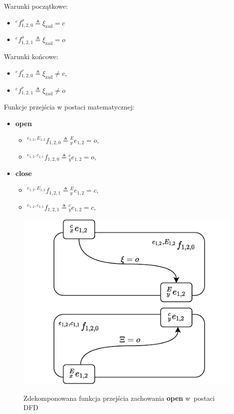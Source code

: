 Warunki początkowe:
\begin{itemize}
    \item ${}^{e}f^{\sigma}_{1,2,0} \triangleq \xi_{\mathrm{zad}} = c$
    \item ${}^{e}f^{\sigma}_{1,2,1} \triangleq \xi_{\mathrm{zad}} = o$
\end{itemize}

Warunki końcowe:
\begin{itemize}
    \item ${}^{e}f^{\tau}_{1,2,0} \triangleq \xi_{\mathrm{zad}} \neq c$,
    \item ${}^{e}f^{\tau}_{1,2,1} \triangleq \xi_{\mathrm{zad}} \neq o$
\end{itemize}

Funkcje przejścia w postaci matematycznej:
\begin{itemize}
    \item \textbf{open} \begin{itemize}
        \item ${}^{e_{1,2}, E_{1,2}}f_{1,2,0} \triangleq {}^{E}_{y}e_{1,2} = o$,
        \item ${}^{e_{1,2}, c_{1,1}}f_{1,2,0} \triangleq {}^{c}_{y}e_{1,2} = o$,
    \end{itemize} 
    \item \textbf{close} \begin{itemize}
        \item ${}^{e_{1,2}, E_{1,2}}f_{1,2,1} \triangleq {}^{E}_{y}e_{1,2} = c$,
        \item ${}^{e_{1,2}, c_{1,1}}f_{1,2,1} \triangleq {}^{c}_{y}e_{1,2} = c$,
    \end{itemize}
\end{itemize}

\begin{figure}
    \centering
    \includegraphics[width=\columnwidth]{figures/ISR-ve-gripper-fp-open.pdf}
    \label{fig:ve-gripper-fp-open}
    \caption{Zdekomponowana funkcja przejścia zachowania \textbf{open} w~postaci DFD}
\end{figure}

